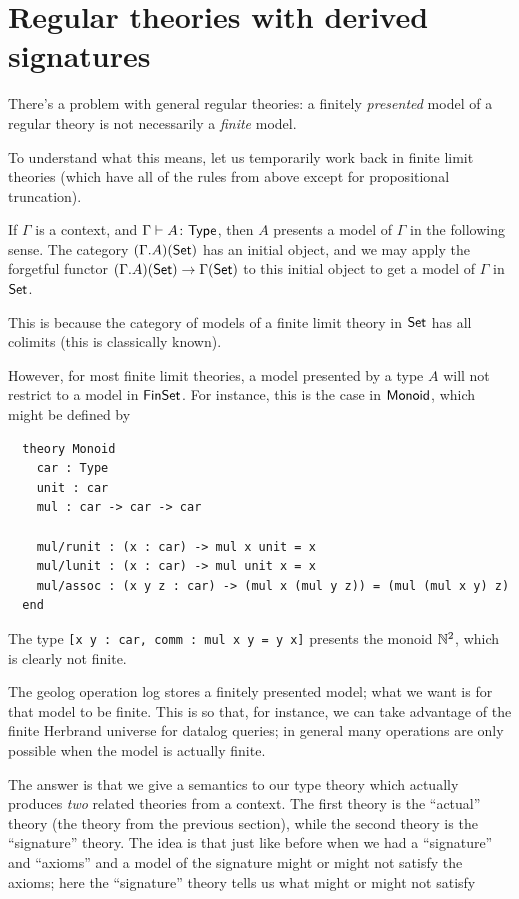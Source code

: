 \documentclass{article}
\begin{document}
\section{Regular theories with derived signatures}

There's a problem with general regular theories: a finitely \emph{presented} model of a regular theory is not necessarily a \emph{finite} model.

To understand what this means, let us temporarily work back in finite limit theories (which have all of the rules from above except for propositional truncation).

If $\Gamma$ is a context, and $\Gamma \vdash A \colon \mathsf{Type}$, then $A$ presents a model of $\Gamma$ in the following sense. The category $(\Gamma.A)(\mathsf{Set})$ has an initial object, and we may apply the forgetful functor $(\Gamma.A)(\mathsf{Set}) \to \Gamma(\mathsf{Set})$ to this initial object to get a model of $\Gamma$ in $\mathsf{Set}$.

This is because the category of models of a finite limit theory in $\mathsf{Set}$ has all colimits (this is classically known).

However, for most finite limit theories, a model presented by a type $A$ will not restrict to a model in $\mathsf{FinSet}$. For instance, this is the case in $\mathsf{Monoid}$, which might be defined by
\begin{verbatim}
  theory Monoid
    car : Type
    unit : car
    mul : car -> car -> car

    mul/runit : (x : car) -> mul x unit = x
    mul/lunit : (x : car) -> mul unit x = x
    mul/assoc : (x y z : car) -> (mul x (mul y z)) = (mul (mul x y) z)
  end
\end{verbatim}
The type \verb|[x y : car, comm : mul x y = y x]| presents the monoid $\mathbb{N}^2$, which is clearly not finite.

The geolog operation log stores a finitely presented model; what we want is for that model to be finite. This is so that, for instance, we can take advantage of the finite Herbrand universe for datalog queries; in general many operations are only possible when the model is actually finite.

The answer is that we give a semantics to our type theory which actually produces \emph{two} related theories from a context. The first theory is the ``actual'' theory (the theory from the previous section), while the second theory is the ``signature'' theory. The idea is that just like before when we had a ``signature'' and ``axioms'' and a model of the signature might or might not satisfy the axioms; here the ``signature'' theory tells us what might or might not satisfy
\end{document}
